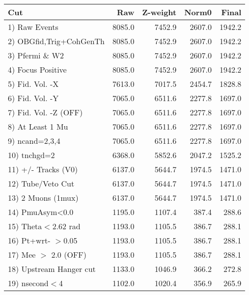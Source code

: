  \begin{table}[h!]\centering
 \begin{tabular}{||l||r|r|r|r||}
 \hline
 \hline
 Cut & Raw & Z-weight & Norm0 & Final \\
 \hline
  1) Raw Events           &      8085.0 &      7452.9 &      2607.0 &      1942.2 \\
  2) OBGfid,Trig+CohGenTh &      8085.0 &      7452.9 &      2607.0 &      1942.2 \\
  3) Pfermi \& W2         &      8085.0 &      7452.9 &      2607.0 &      1942.2 \\
  4) Focus Positive       &      8085.0 &      7452.9 &      2607.0 &      1942.2 \\
  5) Fid. Vol. -X         &      7613.0 &      7017.5 &      2454.7 &      1828.8 \\
  6) Fid. Vol. -Y         &      7065.0 &      6511.6 &      2277.8 &      1697.0 \\
  7) Fid. Vol. -Z (OFF)   &      7065.0 &      6511.6 &      2277.8 &      1697.0 \\
  8) At Least 1 Mu        &      7065.0 &      6511.6 &      2277.8 &      1697.0 \\
  9) ncand=2,3,4          &      7065.0 &      6511.6 &      2277.8 &      1697.0 \\
 10) tnchgd=2             &      6368.0 &      5852.6 &      2047.2 &      1525.2 \\
 11) +/- Tracks (V0)      &      6137.0 &      5644.7 &      1974.5 &      1471.0 \\
 12) Tube/Veto Cut        &      6137.0 &      5644.7 &      1974.5 &      1471.0 \\
 13) 2 Muons (1mux)       &      6137.0 &      5644.7 &      1974.5 &      1471.0 \\
 14) PmuAsym<0.0          &      1195.0 &      1107.4 &       387.4 &       288.6 \\
 15) Theta$<$2.62 rad     &      1193.0 &      1105.5 &       386.7 &       288.1 \\
 16) Pt+wrt- $>$0.05      &      1193.0 &      1105.5 &       386.7 &       288.1 \\
 17) Mee $>$ 2.0  (OFF)   &      1193.0 &      1105.5 &       386.7 &       288.1 \\
 18) Upstream Hanger cut  &      1133.0 &      1046.9 &       366.2 &       272.8 \\
 19) nsecond$<$4          &      1102.0 &      1020.4 &       356.9 &       265.9 \\

\end{tabular}
\end{table}
